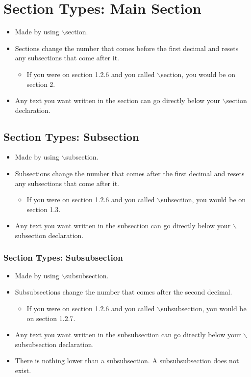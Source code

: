 \documentclass{article}
\begin{document}
	\section{Section Types: Main Section}
		\begin{itemize}
			\item Made by using $\backslash$section.
			\item Sections change the number that comes before the first decimal and resets any subsections that come after it.
			\begin{itemize}
				\item If you were on section 1.2.6 and you called $\backslash$section, you would be on section 2.
			\end{itemize}
			\item Any text you want written in the section can go directly below your $\backslash$section declaration.
		\end{itemize}

		\subsection{Section Types: Subsection}
			\begin{itemize}
				\item Made by using $\backslash$subsection.
				\item Subsections change the number that comes after the first decimal and resets any subsections that come after it.
				\begin{itemize}
					\item If you were on section 1.2.6 and you called $\backslash$subsection, you would be on section 1.3.
				\end{itemize}
				\item Any text you want written in the subsection can go directly below your $\backslash$subsection declaration.
			\end{itemize}
	
			\subsubsection{Section Types: Subsubsection}
				\begin{itemize}
					\item Made by using $\backslash$subsubsection.
					\item Subsubsections change the number that comes after the second decimal.
					\begin{itemize}
						\item If you were on section 1.2.6 and you called $\backslash$subsubsection, you would be on section 1.2.7.
					\end{itemize}
					\item Any text you want written in the subsubsection can go directly below your $\backslash$subsubsection declaration.
					\item There is nothing lower than a subsubsection. A subsubsubsection does not exist.
				\end{itemize}
\end{document}
